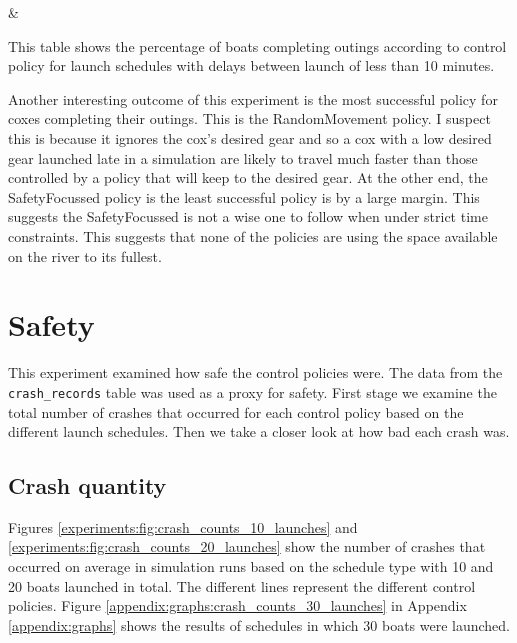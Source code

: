   \begin{table}[h]
  \centering
  {\cp & \landed}
  \caption{This table shows the percentage of boats completing outings according to control policy for launch schedules with delays between launch of less than 10 minutes.}
  \label{experiments:tab:returning_boats_by_policy_small_delay}
  \end{table}
  
  Another interesting outcome of this experiment is the most successful policy for coxes completing their outings. This is the RandomMovement policy. I suspect this is because it ignores the cox's desired gear and so a cox with a low desired gear launched late in a simulation are likely to travel much faster than those controlled by a policy that will keep to the desired gear. At the other end, the SafetyFocussed policy is the least successful policy is by a large margin. This suggests the SafetyFocussed is not a wise one to follow when under strict time constraints. This suggests that none of the policies are using the space available on the river to its fullest.
  
\section{Safety}
This experiment examined how safe the control policies were. The data from the \texttt{crash\_records} table was used as a proxy for safety. First stage we examine the total number of crashes that occurred for each control policy based on the different launch schedules. Then we take a closer look at how bad each crash was.
  
  \subsection{Crash quantity}
  Figures \ref{experiments:fig:crash_counts_10_launches} and \ref{experiments:fig:crash_counts_20_launches} show the number of crashes that occurred on average in simulation runs based on the schedule type with 10 and 20 boats launched in total. The different lines represent the different control policies. Figure \ref{appendix:graphs:crash_counts_30_launches} in Appendix \ref{appendix:graphs} shows the results of schedules in which 30 boats were launched.
  
